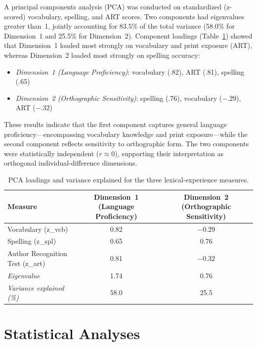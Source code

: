 \documentclass[preprint,12pt, authoryear, review]{elsarticle}
\begin{document}
A principal components analysis (PCA) was conducted on standardized (z-scored) vocabulary, spelling, and ART scores. Two components had eigenvalues greater than~1, jointly accounting for 83.5\% of the total variance (58.0\% for Dimension~1 and 25.5\% for Dimension~2). Component loadings (Table~\ref{tab:pca_loadings}) showed that Dimension~1 loaded most strongly on vocabulary and print exposure (ART), whereas Dimension~2 loaded most strongly on spelling accuracy:

\begin{itemize}
	\item[-] \textit{Dimension~1 (Language Proficiency)}: vocabulary (.82), ART (.81), spelling (.65)
	\item[-] \textit{Dimension~2 (Orthographic Sensitivity)}: spelling (.76), vocabulary ($-.29$), ART ($-.32$)
\end{itemize}

These results indicate that the first component captures general language proficiency—encompassing vocabulary knowledge and print exposure—while the second component reflects sensitivity to orthographic form. The two components were statistically independent ($r \approx 0$), supporting their interpretation as orthogonal individual-difference dimensions.


\begin{table}[ht]
	\centering
	\caption{PCA loadings and variance explained for the three lexical-experience measures.}
	\label{tab:pca_loadings}
	\begin{tabular}{lcc}
		\toprule
		\textbf{Measure} & \textbf{Dimension~1 (Language Proficiency)} & \textbf{Dimension~2 (Orthographic Sensitivity)} \\
		\midrule
		Vocabulary (z\_vcb) & 0.82 & $-0.29$ \\
		Spelling (z\_spl) & 0.65 & 0.76 \\
		Author Recognition Test (z\_art) & 0.81 & $-0.32$ \\
		\midrule
		\textit{Eigenvalue} & 1.74 & 0.76 \\
		\textit{Variance explained (\%)} & 58.0 & 25.5 \\
		\bottomrule
	\end{tabular}
\end{table}

\section{Statistical Analyses}
\end{document}
